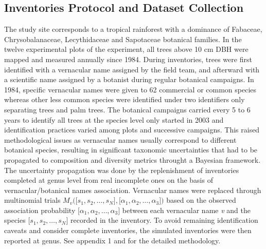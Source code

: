 \documentclass[fleqn,10pt]{ArtEcoFoG} %
\begin{document}
\subsection{Inventories Protocol and Dataset
Collection}\label{inventories-protocol-and-dataset-collection}

The study site corresponds to a tropical rainforest with a dominance of
Fabaceae, Chrysobalanaceae, Lecythidaceae and Sapotaceae botanical
families. In the twelve experimental plots of the experiment, all trees
above 10 cm DBH were mapped and measured annually since 1984. During
inventories, trees were first identified with a vernacular name assigned
by the field team, and afterward with a scientific name assigned by a
botanist during regular botanical campaigns. In 1984, specific
vernacular names were given to 62 commercial or common species whereas
other less common species were identified under two identifiers only
separating trees and palm trees. The botanical campaigns carried every 5
to 6 years to identify all trees at the species level only started in
2003 and identification practices varied among plots and successive
campaigns. This raised methodological issues as vernacular names usually
correspond to different botanical species, resulting in significant
taxonomic uncertainties that had to be propagated to composition and
diversity metrics throught a Bayesian framework. The uncertainty
propagation was done by the replenishment of inventories completed at
genus level from real incomplete ones on the basis of
vernacular/botanical names association. Vernacular names were replaced
through multinomial trials
\(M_v\Big(\big[s_1, s_2, …, s_N\big],\big[\alpha_1, \alpha_2,…, \alpha_3\big]\Big)\)
based on the observed association probability
\(\big[\alpha_1, \alpha_2,…, \alpha_3\big]\) between each vernacular
name \emph{v} and the species \(\big[s_1, s_2, …, s_N\big]\) recorded in
the inventory. To avoid remaining identification caveats and consider
complete inventories, the simulated inventories were then reported at
genus. See appendix 1 and \citet{Aubry-Kientz2013} for the detailed
methodology.
\end{document}
